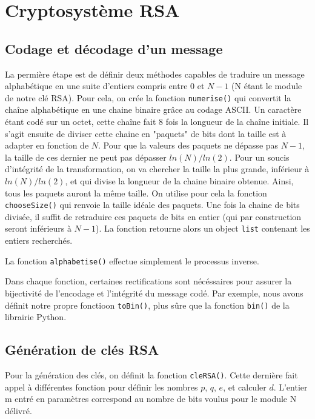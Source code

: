 \documentclass[titlepage]{article}
\begin{document}
    \section{Cryptosystème RSA}
    \subsection{Codage et décodage d'un message}
    La permière étape est de définir deux méthodes capables de traduire un message alphabétique en une suite d'entiers compris entre $0$ et $N-1$ (N étant le module de notre clé RSA).
    Pour cela, on crée la fonction \texttt{numerise()} qui convertit la chaîne alphabétique en une chaine binaire grâce au codage ASCII. Un caractère étant codé sur un octet, cette chaîne fait 8 fois la longueur de la chaîne initiale.
    Il s'agit ensuite de diviser cette chaine en "paquets" de bits dont la taille est à adapter en fonction de $N$.
    Pour que la valeurs des paquets ne dépasse pas $N-1$, la taille de ces dernier ne peut pas dépasser $ln(N)/ln(2)$. Pour un soucis d'intégrité de la transformation, on va chercher la taille la plus grande, inférieur à $ln(N)/ln(2)$, et qui divise la longueur de la chaine binaire obtenue.
    Ainsi, tous les paquets auront la même taille. On utilise pour cela la fonction \texttt{chooseSize()} qui renvoie la taille idéale des paquets.
    Une fois la chaine de bits divisée, il suffit de retraduire ces paquets de bits en entier (qui par construction seront inférieurs à $N-1$).
    La fonction retourne alors un object \texttt{list} contenant les entiers recherchés.

    

    La fonction \texttt{alphabetise()} effectue simplement le processus inverse.
    
    

    Dans chaque fonction, certaines rectifications sont nécéssaires pour assurer la bijectivité de l'encodage et l'intégrité du message codé. Par exemple, nous avons définit notre propre fonctioon \texttt{toBin()}, plus sûre que la fonction \texttt{bin()} de la librairie Python. 

    \subsection{Génération de clés RSA}
    Pour la génération des clés, on définit la fonction \texttt{cleRSA()}. Cette dernière fait appel à différentes fonction pour définir les nombres $p$, $q$, $e$, et calculer $d$.
    L'entier m entré en paramètres correspond au nombre de bits voulus pour le module N délivré.
\end{document}
